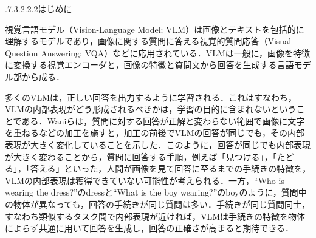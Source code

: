 \documentclass[10pt,dvipdfmx]{jarticle}
\makeatletter
\renewcommand{\section}{\@startsection{section}{1}{\z@}%
  {.7\Cvs \@plus.3\Cvs \@minus.2\Cvs}{.2\Cvs \@plus.2\Cvs}{\normalfont\Large\bfseries}}
\makeatother
\begin{document}
\pagestyle{empty}


\section{はじめに}
\label{sec:intro}

視覚言語モデル（Vision-Language Model; VLM）は画像とテキストを包括的に理解するモデルであり，画像に関する質問に答える視覚的質問応答（Visual Question Answering; VQA）などに応用されている．VLMは一般に，画像を特徴に変換する視覚エンコーダと，画像の特徴と質問文から回答を生成する言語モデル部から成る．

多くのVLMは，正しい回答を出力するように学習される．これはすなわち，VLMの内部表現がどう形成されるべきかは，学習の目的に含まれないということである．Waniら\cite{wani}は，質問に対する回答が正解と変わらない範囲で画像に文字を重ねるなどの加工を施すと，加工の前後でVLMの回答が同じでも，その内部表現が大きく変化していることを示した．このように，回答が同じでも内部表現が大きく変わることから，質問に回答する手順，例えば「見つける」，「たどる」，「答える」といった，人間が画像を見て回答に至るまでの手続きの特徴を，VLMの内部表現は獲得できていない可能性が考えられる．一方，``Who is wearing the dress?''のdressと``What is the boy wearing?''のboyのように，質問中の物体が異なっても，回答の手続きが同じ質問は多い．手続きが同じ質問同士，すなわち類似するタスク間で内部表現が近ければ，VLMは手続きの特徴を物体によらず共通に用いて回答を生成し，回答の正確さが高まると期待できる．
\end{document}
